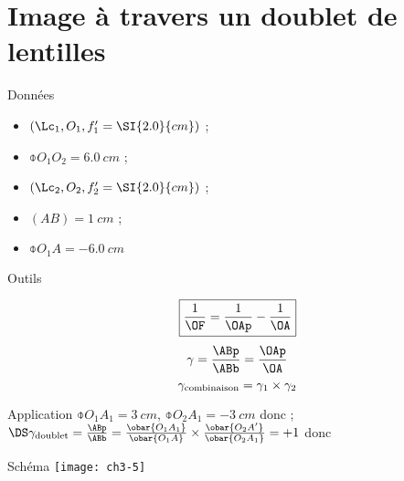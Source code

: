 \documentclass[../main/main.tex]{subfiles}
\begin{document}
\section{Image à travers un doublet de lentilles}
\begin{tcbraster}[raster columns=3, raster equal height=rows]
    \begin{NCdefi}{Données}
        \begin{itemize}
            \item $(\Lc_1, O_1, f_1'= \SI{2.0}{cm})$ ;
            \item $\obar{O_1O_2} = \SI{+6.0}{cm}$ ;
            \item $(\Lc_2, O_2, f_2' = \SI{2.0}{cm})$ ;
            \item $(AB) = \SI{1}{cm}$ ;
            \item $\obar{O_1A} = \SI{-6.0}{cm}$
        \end{itemize}
    \end{NCdefi}
    \begin{NCdemo}{Outils}
        \[\boxed{ \frac{1}{\OF} = \frac{1}{\OAp} - \frac{1}{\OA}}\]
        \[\gamma = \frac{\ABp}{\ABb} = \frac{\OAp}{\OA}\]
        \[\gamma_{\rm combinaison} = \gamma_1\times\gamma_2\]
    \end{NCdemo}
    \begin{NCexem}{Application}
        $\obar{O_1A_1} = \SI{3}{cm}$, $\obar{O_2A_1} = \SI{-3}{cm}$ donc
         ;\smallbreak
        $\DS \gamma_{\rm doublet} = \frac{\ABp}{\ABb} =
        \frac{\obar{O_1A_1}}{\obar{O_1A}}\times
        \frac{\obar{O_2A'}}{\obar{O_2A_1}} = +1$ donc\smallbreak
        \fbox{$(\ABp) = (\ABb)$}
    \end{NCexem}
\end{tcbraster}
\begin{center}
    \begin{NCrema}{Schéma}
        \texttt{[image: ch3-5]}
    \end{NCrema}
\end{center}
\end{document}

